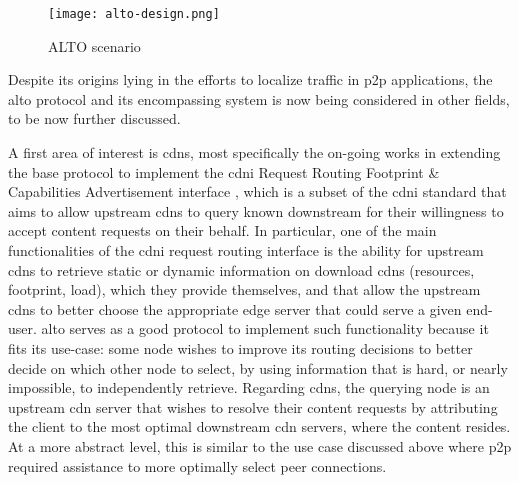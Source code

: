     \begin{figure}[H]
    \centering
    \texttt{[image: alto-design.png]}
    \caption{ALTO scenario \cite{seedorf2009}}
    \label{fig:alto-design}
    \end{figure}

    Despite its origins lying in the efforts to localize traffic in \gls{p2p} applications, the \gls{alto} protocol and its encompassing system is now being considered in other fields, to be now further discussed.

    A first area of interest is \glspl{cdn}, most specifically the on-going works in extending the base protocol to implement the \gls{cdni} Request Routing Footprint \& Capabilities Advertisement interface \cite{alto-cdni}, which is a subset of the \gls{cdni} standard \cite{cdni-problem-statement} that aims to allow upstream \glspl{cdn} to query known downstream  for their willingness to accept content requests on their behalf.
    In particular, one of the main functionalities of the \gls{cdni} request routing interface is the ability for upstream \glspl{cdn} to retrieve static or dynamic information on download \glspl{cdn} (resources, footprint, load), which they provide themselves, and that allow the upstream \glspl{cdn} to better choose the appropriate edge server that could serve a given end-user.
    \gls{alto} serves as a good protocol to implement such functionality because it fits its use-case: some node wishes to improve its routing decisions to better decide on which other node to select, by using information that is hard, or nearly impossible, to independently retrieve. 
    Regarding \glspl{cdn}, the querying node is an upstream \gls{cdn} server that wishes to resolve their content requests by attributing the client to the most optimal downstream \gls{cdn} servers, where the content resides.
    At a more abstract level, this is similar to the use case discussed above where \gls{p2p} required assistance to more optimally select peer connections.

